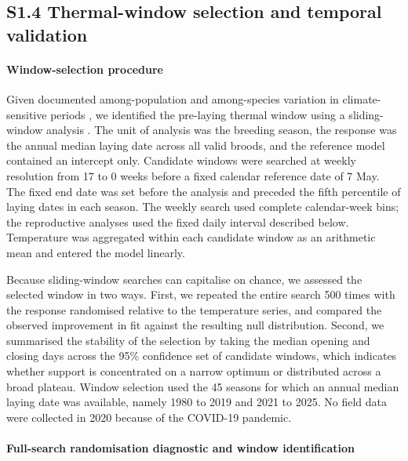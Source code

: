 \documentclass{article}
\begin{document}
\subsection{S1.4 Thermal-window selection and temporal validation}

\paragraph{Window-selection procedure}

Given documented among-population and among-species variation in climate-sensitive periods \citep{samplonius2018phenological}, we identified the pre-laying thermal window using a sliding-window analysis \citep{vandepol2016identifying}. The unit of analysis was the breeding season, the response was the annual median laying date across all valid broods, and the reference model contained an intercept only. Candidate windows were searched at weekly resolution from 17 to 0 weeks before a fixed calendar reference date of 7 May. The fixed end date was set before the analysis and preceded the fifth percentile of laying dates in each season. The weekly search used complete calendar-week bins; the reproductive analyses used the fixed daily interval described below. Temperature was aggregated within each candidate window as an arithmetic mean and entered the model linearly.

Because sliding-window searches can capitalise on chance, we assessed the selected window in two ways. First, we repeated the entire search 500 times with the response randomised relative to the temperature series, and compared the observed improvement in fit against the resulting null distribution. Second, we summarised the stability of the selection by taking the median opening and closing days across the 95\% confidence set of candidate windows, which indicates whether support is concentrated on a narrow optimum or distributed across a broad plateau. Window selection used the 45 seasons for which an annual median laying date was available, namely 1980 to 2019 and 2021 to 2025. No field data were collected in 2020 because of the COVID-19 pandemic.

\paragraph{Full-search randomisation diagnostic and window identification}
\end{document}
